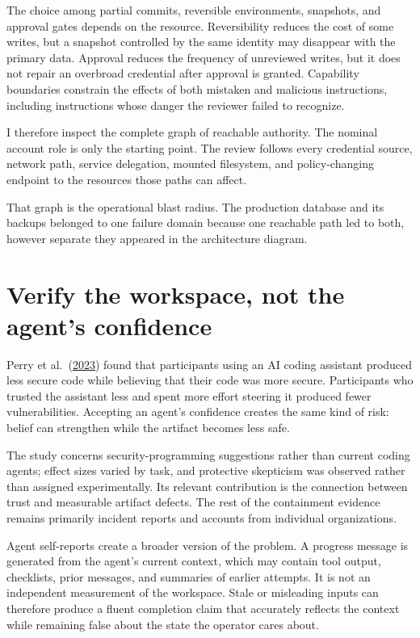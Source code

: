 The choice among partial commits, reversible environments, snapshots, and approval gates depends on the resource. Reversibility reduces the cost of some writes, but a snapshot controlled by the same identity may disappear with the primary data. Approval reduces the frequency of unreviewed writes, but it does not repair an overbroad credential after approval is granted. Capability boundaries constrain the effects of both mistaken and malicious instructions, including instructions whose danger the reviewer failed to recognize.

I therefore inspect the complete graph of reachable authority. The nominal account role is only the starting point. The review follows every credential source, network path, service delegation, mounted filesystem, and policy-changing endpoint to the resources those paths can affect.

That graph is the operational blast radius. The production database and its backups belonged to one failure domain because one reachable path led to both, however separate they appeared in the architecture diagram.

\hypertarget{verify-the-workspace-not-the-agents-confidence}{%
\section{Verify the workspace, not the agent's confidence}\label{verify-the-workspace-not-the-agents-confidence}}

Perry et al.~(\href{https://arxiv.org/abs/2211.03622}{2023}) found that participants using an AI coding assistant produced less secure code while believing that their code was more secure. Participants who trusted the assistant less and spent more effort steering it produced fewer vulnerabilities. Accepting an agent's confidence creates the same kind of risk: belief can strengthen while the artifact becomes less safe.

The study concerns security-programming suggestions rather than current coding agents; effect sizes varied by task, and protective skepticism was observed rather than assigned experimentally. Its relevant contribution is the connection between trust and measurable artifact defects. The rest of the containment evidence remains primarily incident reports and accounts from individual organizations.

Agent self-reports create a broader version of the problem. A progress message is generated from the agent's current context, which may contain tool output, checklists, prior messages, and summaries of earlier attempts. It is not an independent measurement of the workspace. Stale or misleading inputs can therefore produce a fluent completion claim that accurately reflects the context while remaining false about the state the operator cares about.

